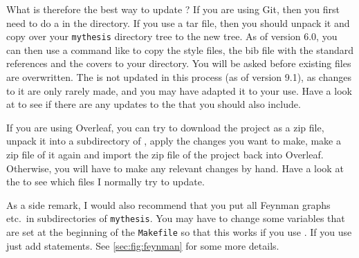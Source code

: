 What is therefore the best way to update ?
If you are using Git, then you first need to do a 
in the  directory.
If you use a tar file, then you should unpack it and copy over your
\texttt{mythesis} directory tree to the new  tree.
As of version 6.0, you can then use a command like
 to copy the style files,
the bib file with the standard references and the covers to your
 directory.
You will be asked before existing files are overwritten.
The  is not updated in this process (as of version 9.1),
as changes to it are only rarely made,
and you may have adapted it to your use.
Have a look at  to see if there are any updates to the  that you should also include.

If you are using Overleaf, you can try to download the project as a zip file,
unpack it into a subdirectory of ,
apply the changes you want to make,
make a zip file of it again
and import the zip file of the project back into Overleaf.
Otherwise, you will have to make any relevant changes by hand.
Have a look at the  to see which files I normally try to update.

As a side remark, I would also recommend that you put all Feynman
graphs etc.\ in subdirectories of \texttt{mythesis}. You may have to
change some variables that are set at the beginning of the
\texttt{Makefile} so that this works if you use . If
you use  just add  statements.
See \cref{sec:fig:feynman} for some more details.
